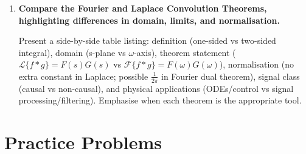 \documentclass[12pt,a4paper]{article}
\begin{document}
\begin{enumerate}[label=\textbf{Q\arabic*.}, leftmargin=*, itemsep=8pt]
\item \textbf{Compare the Fourier and Laplace Convolution Theorems, highlighting differences
  in domain, limits, and normalisation.}

  Present a side-by-side table listing: definition (one-sided vs two-sided
  integral), domain (s-plane vs $\omega$-axis), theorem statement ($\mathcal{L}
  \{f*g\}=F(s)G(s)$ vs $\mathcal{F}\{f*g\}=F(\omega)G(\omega)$), normalisation
  (no extra constant in Laplace; possible $\frac{1}{2\pi}$ in Fourier dual
  theorem), signal class (causal vs non-causal), and physical applications
  (ODEs/control vs signal processing/filtering). Emphasise when each theorem is
  the appropriate tool.

\end{enumerate}

\section{Practice Problems}
\end{document}
